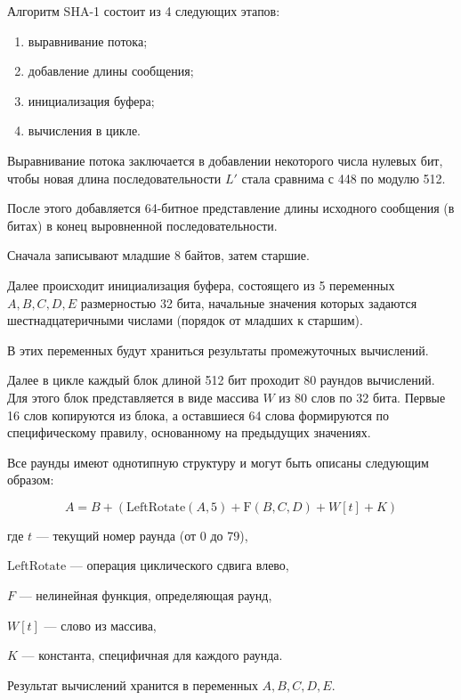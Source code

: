 Алгоритм SHA-1 состоит из 4 следующих этапов:

\begin{enumerate}
	\item выравнивание потока;
	\item добавление длины сообщения;
	\item инициализация буфера;
	\item вычисления в цикле.
\end{enumerate}

Выравнивание потока заключается в добавлении некоторого числа нулевых бит, чтобы новая длина последовательности $ L' $ стала сравнима с 448 по модулю 512. 

После этого добавляется 64-битное представление длины исходного сообщения (в битах) в конец выровненной последовательности.

Сначала записывают младшие 8 байтов, затем старшие.

Далее происходит инициализация буфера, состоящего из 5 переменных $ A, B, C, D, E $ размерностью 32 бита, начальные значения которых задаются шестнадцатеричными числами (порядок от младших к старшим).

В этих переменных будут храниться результаты промежуточных вычислений.

Далее в цикле каждый блок длиной 512 бит проходит 80 раундов вычислений. Для этого блок представляется в виде массива $ W $ из 80 слов по 32 бита. Первые 16 слов копируются из блока, а оставшиеся 64 слова формируются по специфическому правилу, основанному на предыдущих значениях.

Все раунды имеют однотипную структуру и могут быть описаны следующим образом:

$$ A = B + \left( \text{LeftRotate}(A, 5) + \text{F}(B, C, D) + W[t] + K \right) $$

где $ t $ — текущий номер раунда (от 0 до 79), 

$ \text{LeftRotate} $ — операция циклического сдвига влево, 

$ F $ — нелинейная функция, определяющая раунд, 

$ W[t] $ — слово из массива, 

$ K $ — константа, специфичная для каждого раунда.

Результат вычислений хранится в переменных $ A, B, C, D, E $.
